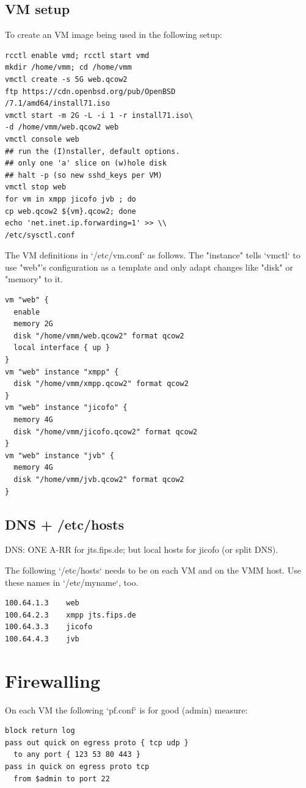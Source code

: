 \documentclass[conference]{IEEEtran}
\begin{document}
\subsection{VM setup}
To create an VM image being used in the following setup:
\begin{verbatim}
rcctl enable vmd; rcctl start vmd
mkdir /home/vmm; cd /home/vmm
vmctl create -s 5G web.qcow2
ftp https://cdn.openbsd.org/pub/OpenBSD
/7.1/amd64/install71.iso
vmctl start -m 2G -L -i 1 -r install71.iso\
-d /home/vmm/web.qcow2 web
vmctl console web
## run the (I)nstaller, default options.
## only one 'a' slice on (w)hole disk
## halt -p (so new sshd_keys per VM)
vmctl stop web
for vm in xmpp jicofo jvb ; do 
cp web.qcow2 ${vm}.qcow2; done
echo 'net.inet.ip.forwarding=1' >> \\
/etc/sysctl.conf
\end{verbatim}
The VM definitions in `/etc/vm.conf` as follows. The "instance" tells `vmctl`
to use "web"'s configuration as a template and only adapt changes like "disk"
or "memory" to it.
\begin{verbatim}
vm "web" {
  enable
  memory 2G
  disk "/home/vmm/web.qcow2" format qcow2
  local interface { up }
}
vm "web" instance "xmpp" {
  disk "/home/vmm/xmpp.qcow2" format qcow2
}
vm "web" instance "jicofo" {
  memory 4G
  disk "/home/vmm/jicofo.qcow2" format qcow2
}
vm "web" instance "jvb" {
  memory 4G
  disk "/home/vmm/jvb.qcow2" format qcow2
}
\end{verbatim}
\subsection{DNS + /etc/hosts}
DNS: ONE A-RR for jts.fips.de; but local hosts for jicofo (or split DNS).

The following `/etc/hosts` needs to be on each VM and on the VMM host.
Use these names in `/etc/myname`, too.
\begin{verbatim}
100.64.1.3    web
100.64.2.3    xmpp jts.fips.de
100.64.3.3    jicofo
100.64.4.3    jvb
\end{verbatim}
\section{Firewalling}
On each VM the following `pf.conf` is for good (admin) measure:
\begin{verbatim}
block return log
pass out quick on egress proto { tcp udp }
  to any port { 123 53 80 443 }
pass in quick on egress proto tcp 
  from $admin to port 22
\end{verbatim}
\end{document}
